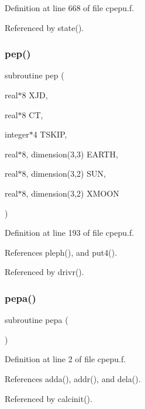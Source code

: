 Definition at line 668 of file cpepu.\+f.



Referenced by state().

\mbox{\label{cpepu_8f_a5a9f77cb0d3259a84a37bf8ddf805115}} 
\subsubsection{\texorpdfstring{pep()}{pep()}}
{\footnotesize\ttfamily subroutine pep (\begin{DoxyParamCaption}\item[{real$\ast$8}]{X\+JD,  }\item[{real$\ast$8}]{CT,  }\item[{integer$\ast$4}]{T\+S\+K\+IP,  }\item[{real$\ast$8, dimension(3,3)}]{E\+A\+R\+TH,  }\item[{real$\ast$8, dimension(3,2)}]{S\+UN,  }\item[{real$\ast$8, dimension(3,2)}]{X\+M\+O\+ON }\end{DoxyParamCaption})}



Definition at line 193 of file cpepu.\+f.



References pleph(), and put4().



Referenced by drivr().

\mbox{\label{cpepu_8f_a4990ddf7cb013fe6cd08d5bb49a55122}} 
\subsubsection{\texorpdfstring{pepa()}{pepa()}}
{\footnotesize\ttfamily subroutine pepa (\begin{DoxyParamCaption}{ }\end{DoxyParamCaption})}



Definition at line 2 of file cpepu.\+f.



References adda(), addr(), and dela().



Referenced by calcinit().

